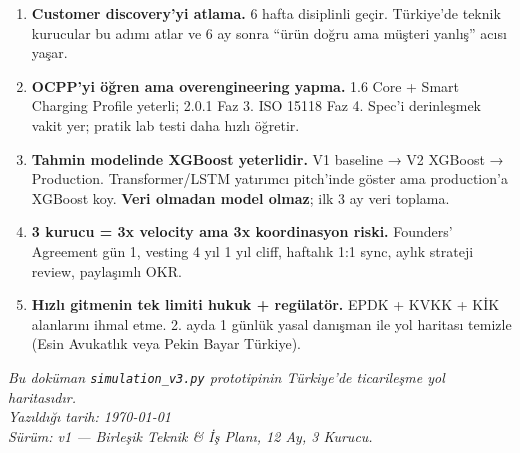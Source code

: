 \documentclass[11pt,a4paper]{article}
\begin{document}
\begin{enumerate}
    \item \textbf{Customer discovery'yi atlama.} 6 hafta disiplinli geçir. Türkiye'de teknik kurucular bu adımı atlar ve 6 ay sonra ``ürün doğru ama müşteri yanlış'' acısı yaşar.

    \item \textbf{OCPP'yi öğren ama overengineering yapma.} 1.6 Core + Smart Charging Profile yeterli; 2.0.1 Faz 3. ISO 15118 Faz 4. Spec'i derinleşmek vakit yer; pratik lab testi daha hızlı öğretir.

    \item \textbf{Tahmin modelinde XGBoost yeterlidir.} V1 baseline → V2 XGBoost → Production. Transformer/LSTM yatırımcı pitch'inde göster ama production'a XGBoost koy. \textbf{Veri olmadan model olmaz}; ilk 3 ay veri toplama.

    \item \textbf{3 kurucu = 3x velocity ama 3x koordinasyon riski.} Founders' Agreement gün 1, vesting 4 yıl 1 yıl cliff, haftalık 1:1 sync, aylık strateji review, paylaşımlı OKR.

    \item \textbf{Hızlı gitmenin tek limiti hukuk + regülatör.} EPDK + KVKK + KİK alanlarını ihmal etme. 2. ayda 1 günlük yasal danışman ile yol haritası temizle (Esin Avukatlık veya Pekin Bayar Türkiye).
\end{enumerate}

\vspace{1cm}
\begin{center}
\textit{Bu doküman \texttt{simulation\_v3.py} prototipinin Türkiye'de ticarileşme yol haritasıdır.\\
Yazıldığı tarih: \today\\
Sürüm: v1 — Birleşik Teknik \& İş Planı, 12 Ay, 3 Kurucu.}
\end{center}
\end{document}
